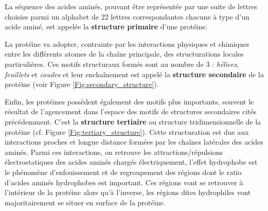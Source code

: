 

La séquence des acides aminés, pouvant être représentée par une suite de lettres choisies parmi un alphabet de 22 lettres correspondantes chacune à type d'un acide aminé, est appelée la \textbf{structure primaire} d'une protéine.

La protéine va adopter, contrainte par les interactions physiques et chimiques entre les différents atomes de la chaîne principale, des structurations locales particulières. Ces motifs structuraux formés sont au nombre de 3 : \textit{hélices}, \textit{feuillets} et \textit{coudes} et leur enchaînement est appelé la \textbf{structure secondaire} de la protéine (voir Figure \ref{Fig:secondary_structure}).

Enfin, les protéines possèdent également des motifs plus importants, souvent le résultat de l'agencement dans l'espace des motifs de structures secondaires cités précédemment. C'est la \textbf{structure tertiaire} ou structure tridimensionnelle de la protéine (cf. Figure \ref{Fig:tertiary_structure}). 
Cette structuration est due aux interactions proches et longue distance formées par les chaînes latérales des acides aminés. Parmi ces interactions, on retrouve les attractions/répulsions électrostatiques des acides aminés chargés électriquement, l'effet hydrophobe est le phénomène d'enfouissement et de regroupement des régions dont le ratio d'acides aminés hydrophobes est important. Ces régions vont se retrouver à l'intérieur de la protéine alors qu'à l'inverse, les régions dites hydrophiles vont majoritairement se situer en surface de la protéine.

